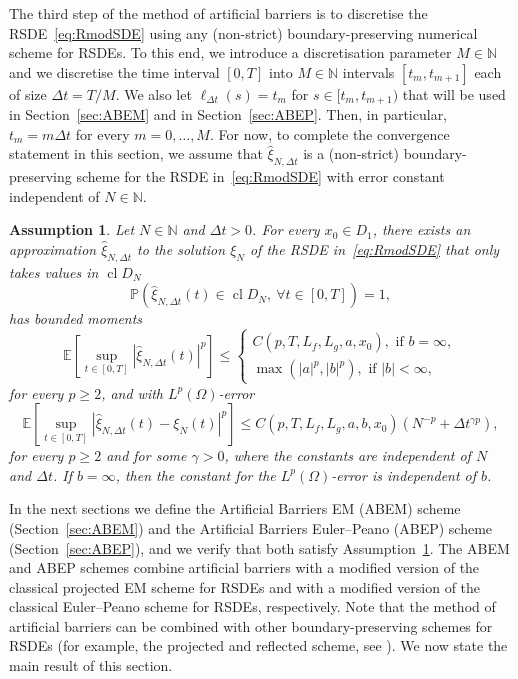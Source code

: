 \documentclass[11pt]{amsart}
\newtheorem{assumption}{Assumption}
\newcommand{\E}{{\mathbb E}}
\newcommand{\PP}{{\mathbb P}}
\newcommand{\CDDN}{\operatorname{cl} D_{N}}
\begin{document}
{The third step of the method of artificial barriers is to discretise the RSDE~\eqref{eq:RmodSDE} using any (non-strict) boundary-preserving numerical scheme for RSDEs. To this end, we introduce a discretisation parameter $M \in \mathbb{N}$ and we discretise the time interval $[0,T]$ into $M \in \mathbb{N}$ intervals $[t_{m},t_{m+1}]$ each of size $\Delta t = T/M$. We also let $\ell_{\Delta t}(s) = t_{m}$ for $s \in [t_{m},t_{m+1})$ that will be used in Section~\ref{sec:ABEM} and in Section~\ref{sec:ABEP}. Then, in particular, $t_{m} = m \Delta t$ for every $m = 0,\ldots, M$.  For now, to complete the convergence statement in this section, we assume that $\hat{\xi}_{N,\Delta t}$ is a (non-strict) boundary-preserving scheme for the RSDE in~\eqref{eq:RmodSDE} with error constant independent of $N \in \mathbb{N}$.
\begin{assumption}\label{ass:BPRSDEscheme}
Let $N \in \mathbb{N}$ and $\Delta t >0$. For every $x_{0} \in D_{1}$, there exists an approximation $\hat{\xi}_{N,\Delta t}$ to the solution $\xi_{N}$ of the RSDE in~\eqref{eq:RmodSDE} that only takes values in $\CDDN$
\begin{equation*}
\PP \left( \hat{\xi}_{N,\Delta t}(t) \in \CDDN,\ \forall t \in [0,T] \right)=1,
\end{equation*}
has bounded moments
\begin{equation*}
\E \left[ \sup_{t \in [0,T]} |\hat{\xi}_{N,\Delta t}(t)|^{p} \right] \leq
\begin{cases}
C(p,T,L_{f},L_{g},a,x_{0}), \text{ if } b = \infty,\\
\max(|a|^{p},|b|^{p}), \text{ if } |b| < \infty,
\end{cases}
\end{equation*}
for every $p \geq 2$, and with $L^{p}(\Omega)$-error
\begin{equation*}
\E \left[ \sup_{t \in [0,T]} |\hat{\xi}_{N,\Delta t}(t) - \xi_{N}(t)|^{p} \right] \leq C(p,T,L_{f},L_{g},a,b,x_{0}) \left( N^{-p} + \Delta t^{\gamma p} \right),
\end{equation*}
for every $p \geq 2$ and for some $\gamma>0$, where the constants are independent of $N$ and $\Delta t$. If $b=\infty$, then the constant for the $L^{p}(\Omega)$-error is independent of $b$.
\end{assumption}
In the next sections we define the Artificial Barriers EM (ABEM) scheme (Section~\ref{sec:ABEM}) and the Artificial Barriers Euler--Peano (ABEP) scheme (Section~\ref{sec:ABEP}), and we verify that both satisfy Assumption~\ref{ass:BPRSDEscheme}. The ABEM and ABEP schemes combine artificial barriers with a modified version of the classical projected EM scheme for RSDEs and with a modified version of the classical Euler--Peano scheme for RSDEs, respectively. Note that the method of artificial barriers can be combined with other boundary-preserving schemes for RSDEs (for example, the projected and reflected scheme, see \cite{MR1341162}). We now state the main result of this section.
}
\end{document}
